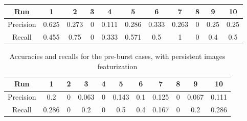 \documentclass{article}
\begin{document}
\begin{appendix}
\begin{table}[h!]
\begin{tabular}{c|c|c|c|c|c|c|c|c|c|c}
Run&1&2&3&4&5&6&7&8&9&10\\
\hline\hline
Precision&0.625&0.273&0&0.111&0.286&0.333&0.263&0&0.25&0.25\\
\hline
Recall&0.455&0.75&0&0.333&0.571&0.5&1&0&0.4&0.5\\

\end{tabular}
\end{table}

\begin{table}[h!]
\caption{Accuracies and recalls for the pre-burst cases, with persistent images featurization}                 %
\label{recalls_accuracies_templatefunctions}    %
\centering                        %
\begin{tabular}{c|c|c|c|c|c|c|c|c|c|c}

Run&1&2&3&4&5&6&7&8&9&10\\
\hline\hline
Precision&0.2&0&0.063&0&0.143&0.1&0.125&0&0.067&0.111\\
\hline
Recall&0.286&0&0.2&0&0.5&0.4&0.167&0&0.2&0.286\\

\end{tabular}
\end{table}

\end{appendix}
\end{document}
